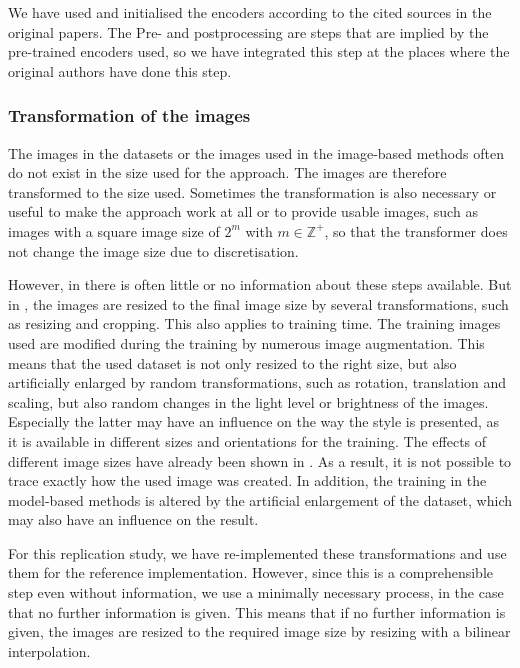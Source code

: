 We have used and initialised the encoders according to the cited sources in the original papers. The Pre- and postprocessing are steps that are implied by the pre-trained encoders used, so we have integrated this step at the places where the original authors have done this step.

\subsubsection{Transformation of the images}
The images in the datasets or the images used in the image-based methods often do not exist in the size used for the approach. The images are therefore transformed to the size used. Sometimes the transformation is also necessary or useful to make the approach work at all or to provide usable images, such as images with a square image size of $2^{m}$ with $ m \in \mathbb{Z}^{+}$, so that the transformer does not change the image size due to discretisation. 

However, in \paper{} there is often little or no information about these steps available. But in \implementation{}, the images are resized to the final image size by several transformations, such as resizing and cropping. This also applies to training time. The training images used are modified during the training by numerous image augmentation. This means that the used dataset is not only resized to the right size, but also artificially enlarged by random transformations, such as rotation, translation and scaling, but also random changes in the light level or brightness of the images. Especially the latter may have an influence on the way the style is presented, as it is available in different sizes and orientations for the training. The effects of different image sizes have already been shown in . As a result, it is not possible to trace exactly how the used image was created. In addition, the training in the model-based methods is altered by the artificial enlargement of the dataset, which may also have an influence on the result.

For this replication study, we have re-implemented these transformations and use them for the reference implementation. However, since this is a comprehensible step even without information, we use a minimally necessary process, in the case that no further information is given. This means that if no further information is given, the images are resized to the required image size by resizing with a bilinear interpolation.

